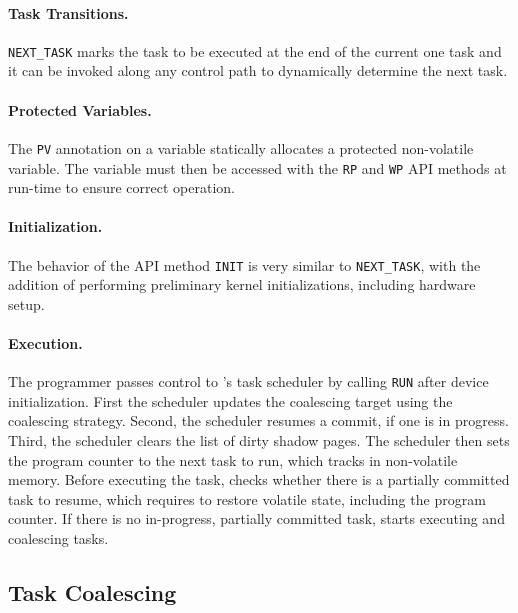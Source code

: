 \paragraph{Task Transitions.} \texttt{NEXT\_TASK} marks the task to be executed at the 
end of the current one task and it can be invoked along
any control path to dynamically determine the next task.

\paragraph{Protected Variables.} The \texttt{PV} annotation on a
variable statically allocates a protected non-volatile variable. The
variable must then be accessed with the \texttt{RP} and \texttt{WP} API methods at
run-time to ensure correct operation.

\paragraph{Initialization.} The behavior of the API method
\texttt{INIT} is very similar to \texttt{NEXT\_TASK}, with the
addition of performing preliminary kernel initializations, including hardware setup.

\paragraph{Execution.} The programmer passes control to \sys's task scheduler 
by calling \texttt{RUN} after device initialization. 
%
First the scheduler updates the coalescing target using the coalescing
strategy.  Second, the scheduler resumes a commit, if one is in progress. Third,
the scheduler clears the list of dirty shadow pages. The scheduler then 
sets the program counter to the next task to run, which \sys tracks in  
non-volatile memory.  
%
Before executing the task, \sys checks whether there is a partially committed
task to resume, which requires \sys to restore volatile state, including the program
counter.  
%
If there is no in-progress, partially committed task, \sys starts executing and
coalescing tasks. 

%
\subsection{Task Coalescing}
%
%
